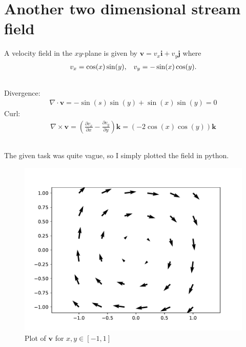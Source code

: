 \documentclass[a4paper,10pt,english]{article}
\begin{document}
\section{Another two dimensional stream field}
A velocity field in the $xy$-plane is given by $\bm{v} = v_x \bm{i} + v_y \bm{j}$ where 
\begin{align}
    v_x = \cos(x)\sin(y),\hspace{.3cm} v_y = -\sin(x)\cos(y).
    \label{eq:5}
\end{align}

\subsection{}
Divergence:
\begin{align*}
    \nabla \cdot \bm{v} = -\sin(s)\sin(y) + \sin(x)\sin(y) = 0
\end{align*}
Curl:
\begin{align*}
    \nabla \times \bm{v} 
    = \left( \frac{\partial v_x}{\partial x} - \frac{\partial v_y}{\partial y} \right)\bm{k}
    = (-2\cos(x)\cos(y))\bm{k}
\end{align*}

\newpage
\subsection{}
The given task was quite vague, so I simply plotted the field in python.

\vspace{-.5cm}
\begin{figure}[h]
    \centering
    \includegraphics[scale=0.7]{figures/figure_3_b.pdf}
    \caption{Plot of $\bm{v}$ for $x, y \in[-1, 1]$}
    \label{fig:figure_3_b}
\end{figure}
\end{document}
